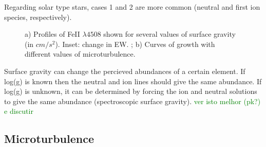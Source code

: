 \documentclass[dvips,12pt,a4paper]{report}
\begin{document}
{Regarding solar type stars, cases 1 and 2 are more common (neutral and first ion species, respectively).

\begin{figure}[h]
\centering
\caption[Line Profiles of FeII with $log\,g$ ; Curves of growth dependent of microturbulence] {a) Profiles of FeII $\lambda4508$ shown for several values of surface gravity (in $cm/s^2$). Inset: change in EW. ; b) Curves of growth with different values of microturbulence.}
\label{cogpmt}
\end{figure}

Surface gravity can change the percieved abundances of a certain element. If log(g) is known then the neutral and ion lines should give the same abundance. If log(g) is unknown, it can be determined by forcing the ion and neutral solutions to give the same abundance (spectroscopic surface gravity). \textcolor{green}{ver isto melhor (pk?) e discutir}

\subsection{Microturbulence}
\label{microturbo}

}
\end{document}
